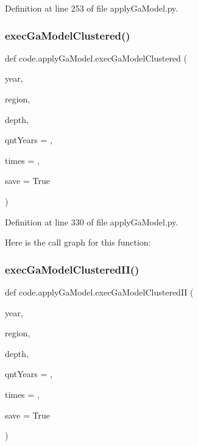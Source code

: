 Definition at line 253 of file apply\+Ga\+Model.\+py.

\mbox{\label{namespacecode_1_1apply_ga_model_a5838725be7016f41093fe1702ecca97e}} 
\subsubsection{\texorpdfstring{exec\+Ga\+Model\+Clustered()}{execGaModelClustered()}}
{\footnotesize\ttfamily def code.\+apply\+Ga\+Model.\+exec\+Ga\+Model\+Clustered (\begin{DoxyParamCaption}\item[{}]{year,  }\item[{}]{region,  }\item[{}]{depth,  }\item[{}]{qnt\+Years = {},  }\item[{}]{times = {},  }\item[{}]{save = {\ttfamily True} }\end{DoxyParamCaption})}



Definition at line 330 of file apply\+Ga\+Model.\+py.

Here is the call graph for this function\+:
\mbox{\label{namespacecode_1_1apply_ga_model_ae7b55f3e8470d957107bbc092724a75a}} 
\subsubsection{\texorpdfstring{exec\+Ga\+Model\+Clustered\+I\+I()}{execGaModelClusteredII()}}
{\footnotesize\ttfamily def code.\+apply\+Ga\+Model.\+exec\+Ga\+Model\+Clustered\+II (\begin{DoxyParamCaption}\item[{}]{year,  }\item[{}]{region,  }\item[{}]{depth,  }\item[{}]{qnt\+Years = {},  }\item[{}]{times = {},  }\item[{}]{save = {\ttfamily True} }\end{DoxyParamCaption})}



